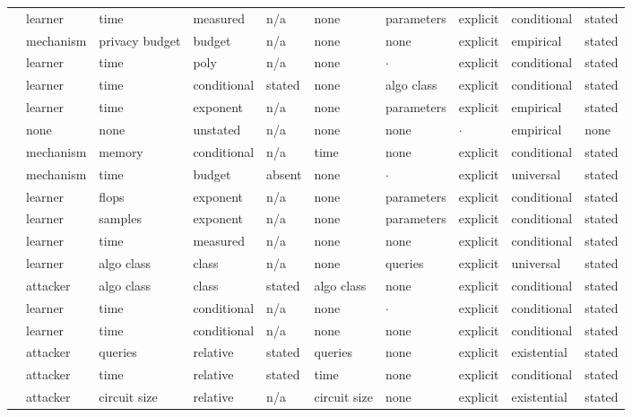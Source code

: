 \begin{landscape}
\begin{longtable}{rlllllllll}
\cite{SGSGM22} & learner & time & measured & n/a & none & parameters & explicit & conditional & stated \\
\cite{ACGMMTZ16} & mechanism & privacy budget & budget & n/a & none & none & explicit & empirical & stated \\
\cite{BJ23} & learner & time & poly & n/a & none & $\cdot$ & explicit & conditional & stated \\
\cite{DHSS25} & learner & time & conditional & stated & none & algo class & explicit & conditional & stated \\
\cite{BSWRLW25} & learner & time & exponent & n/a & none & parameters & explicit & empirical & stated \\
\cite{AQPWPWCR22} & none & none & unstated & n/a & none & none & $\cdot$ & empirical & none \\
\cite{DSWZ23} & mechanism & memory & conditional & n/a & time & none & explicit & conditional & stated \\
\cite{RV24} & mechanism & time & budget & absent & none & $\cdot$ & explicit & universal & stated \\
\cite{BAP24} & learner & flops & exponent & n/a & none & parameters & explicit & conditional & stated \\
\cite{BDKLS24} & learner & samples & exponent & n/a & none & parameters & explicit & conditional & stated \\
\cite{BAP25} & learner & time & measured & n/a & none & none & explicit & conditional & stated \\
\cite{FGRVX17} & learner & algo class & class & n/a & none & queries & explicit & universal & stated \\
\cite{DVV16} & attacker & algo class & class & stated & algo class & none & explicit & conditional & stated \\
\cite{BIS17} & learner & time & conditional & n/a & none & $\cdot$ & explicit & conditional & stated \\
\cite{AS24} & learner & time & conditional & n/a & none & none & explicit & conditional & stated \\
\cite{ACMS23} & attacker & queries & relative & stated & queries & none & explicit & existential & stated \\
\cite{BCS24} & attacker & time & relative & stated & time & none & explicit & conditional & stated \\
\cite{BC22} & attacker & circuit size & relative & n/a & circuit size & none & explicit & existential & stated \\

\end{longtable}
\end{landscape}
